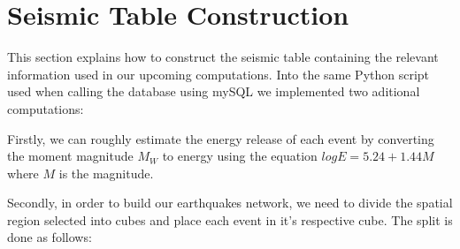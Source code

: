 \clearpage
\section{Seismic Table Construction}
This section explains how to construct the seismic table containing the relevant information used in our upcoming computations. Into the same Python script used when calling the database using mySQL we implemented two aditional computations:

Firstly, we can roughly estimate the energy release of each event by converting the moment magnitude $M_W$ to energy using the equation $log E = 5.24 + 1.44M$ where $M$ is the magnitude. \par 

Secondly, in order to build our earthquakes network, we need to divide the spatial region selected into cubes and place each event in it's respective cube. The split is done as follows:
